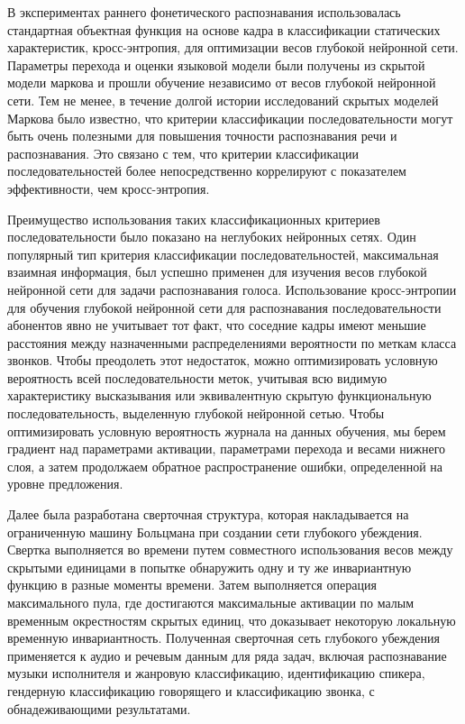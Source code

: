 В экспериментах раннего фонетического распознавания использовалась стандартная объектная функция на основе кадра в классификации статических характеристик, кросс-энтропия, для оптимизации весов глубокой нейронной сети. Параметры перехода и оценки языковой модели были получены из скрытой модели маркова и прошли обучение независимо от весов глубокой нейронной сети. Тем не менее, в течение долгой истории исследований скрытых моделей Маркова было известно, что критерии классификации последовательности могут быть очень полезными для повышения точности распознавания речи и распознавания. Это связано с тем, что критерии классификации последовательностей более непосредственно коррелируют с показателем эффективности, чем кросс-энтропия.

Преимущество использования таких классификационных критериев последовательности было показано на неглубоких нейронных сетях. Один популярный тип критерия классификации последовательностей, максимальная взаимная информация, был успешно применен для изучения весов глубокой нейронной сети для задачи распознавания голоса. Использование кросс-энтропии для обучения глубокой нейронной сети для распознавания последовательности абонентов явно не учитывает тот факт, что соседние кадры имеют меньшие расстояния между назначенными распределениями вероятности по меткам класса звонков. Чтобы преодолеть этот недостаток, можно оптимизировать условную вероятность всей последовательности меток, учитывая всю видимую характеристику высказывания или эквивалентную скрытую функциональную последовательность, выделенную глубокой нейронной сетью. Чтобы оптимизировать условную вероятность журнала на данных обучения, мы берем градиент над параметрами активации, параметрами перехода и весами нижнего слоя, а затем продолжаем обратное распространение ошибки, определенной на уровне предложения.

Далее была разработана сверточная структура, которая накладывается на ограниченную машину Больцмана при создании сети глубокого убеждения. Свертка выполняется во времени путем совместного использования весов между скрытыми единицами в попытке обнаружить одну и ту же инвариантную функцию в разные моменты времени. Затем выполняется операция максимального пула, где достигаются максимальные активации по малым временным окрестностям скрытых единиц, что доказывает некоторую локальную временную инвариантность. Полученная сверточная сеть глубокого убеждения применяется к аудио и речевым данным для ряда задач, включая распознавание музыки исполнителя и жанровую классификацию, идентификацию спикера, гендерную классификацию говорящего и классификацию звонка, с обнадеживающими результатами.

